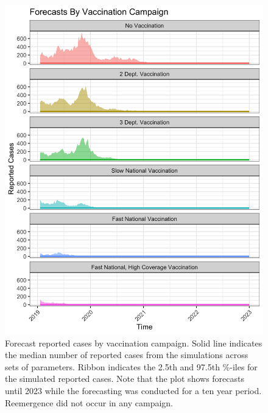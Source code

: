 \documentclass[12pt]{article}
\begin{document}
\begin{figure}[H]
  \centering
  \includegraphics[width=150mm]{fc_plot.png}
  \caption{Forecast reported cases by vaccination campaign. Solid line indicates the median number of reported cases from the simulations across sets of parameters. Ribbon indicates the 2.5th and 97.5th \%-iles for the simulated reported cases. Note that the plot shows forecasts until 2023 while the forecasting was conducted for a ten year period. Reemergence did not occur in any campaign.}
\end{figure}
\end{document}
